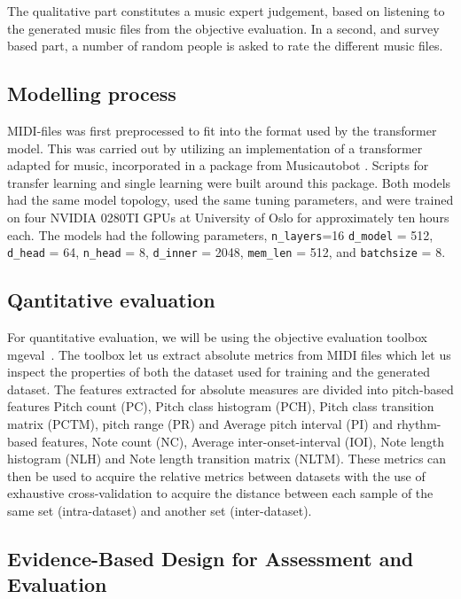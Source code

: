 \documentclass{IEEEtran}
\begin{document}
The qualitative part constitutes a music expert judgement, based on listening
to the generated music files from the objective evaluation. In a second, and
survey based part, a number of random people is asked to rate the different
music files.

\subsection{Modelling process}

MIDI-files was first preprocessed to fit into
the format used by the transformer model. This was carried out by utilizing
an implementation of a transformer adapted for music, incorporated in a
package from Musicautobot \cite{musicautobot}. Scripts for transfer learning
and single learning were built around this package. Both models had the same
model topology, used the same tuning parameters, and were trained on 
four NVIDIA 0280TI GPUs at University of Oslo for approximately ten 
hours each. The models had the following parameters, \lstinline|n_layers|=16
\lstinline|d_model| = 512, \lstinline|d_head| = 64,
\lstinline|n_head| = 8, \lstinline|d_inner| = 2048, \lstinline|mem_len| = 512,
and \lstinline|batchsize| = 8.

\subsection{Qantitative evaluation}

For quantitative evaluation, we will be using the objective evaluation
toolbox mgeval~\cite{yang2020evaluation}. The toolbox let us extract absolute
metrics from MIDI files which let us inspect the properties of both the
dataset used for training and the generated dataset. The features extracted
for absolute measures are divided into pitch-based features Pitch count (PC),
Pitch class histogram (PCH), Pitch class transition matrix (PCTM), pitch
range (PR) and Average pitch interval (PI) and rhythm-based features, Note
count (NC), Average inter-onset-interval (IOI), Note length histogram (NLH)
and Note length transition matrix (NLTM). These metrics can then be used to
acquire the relative metrics between datasets with the use of exhaustive
cross-validation to acquire the distance between each sample of the same set
(intra-dataset) and another set (inter-dataset).

\subsection{Evidence-Based Design for Assessment and Evaluation}
\end{document}
